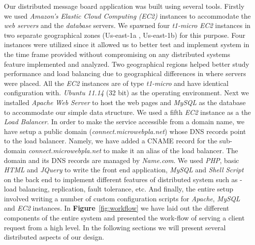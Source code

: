 \documentclass[12pt]{article}
\begin{document}
Our distributed message board application was built using several tools. Firstly we
used \emph{Amazon's Elastic Cloud Computing (EC2)} \cite{ec2} instances to
accommodate the \emph{web servers} and the \emph{database} servers. We spawned
four  \emph{t1-micro EC2} \cite{t1micro} instances in two separate geographical
zones (Us-east-1a , Us-east-1b) for this purpose. Four instances were utilized
since it allowed us to better test and implement system in the time frame
provided without compromising on any distributed systems feature implemented and
analyzed. Two geographical regions helped better study performance and load
balancing due to geographical differences in where servers were placed. All the
\emph{EC2} instances are of type \emph{t1-micro} and have identical configuration with.
\emph{Ubuntu 11.14} (32 bit) as the operating environment. Next
we installed \emph{Apache Web Server} \cite{apache} to host the web pages and
\emph{MySQL} \cite{mysql} as the database to accommodate our simple data
structure. We used a fifth \emph{EC2} instance as a the \emph{Load Balancer}. In
order to make the service accessible from a domain name, we have setup a public
domain (\emph{connect.microwebpla.net}) whose DNS records point to the load balancer. 
Namely, we have added a CNAME \cite{cname} record for the sub-domain
\emph{connect.microwebpla.net} to make it an alias of the load balancer. The
domain and its DNS records are managed by \emph{Name.com}. We used \emph{PHP},
basic \emph{HTML} and \emph{JQuery} \cite{jquery} to write the front end
application, \emph{MySQL} and \emph{Shell Script} on the back end to implement
different features of distributed system such as - load balancing, replication,
fault tolerance, etc. And finally, the entire setup involved writing a number of
custom configuration scripts for \emph{Apache}, \emph{MySQL} and \emph{EC2}
instances. In  \textbf{Figure}~\ref{fig:workflow} we have laid out the different
components of the entire system and presented the work-flow of serving a client
request from a high level. In the following sections we will present several
distributed aspects of our design.
\end{document}
